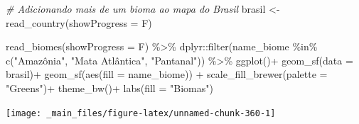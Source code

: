 \documentclass[
  brazilian,
]{book}
\newenvironment{Shaded}{\begin{snugshade}}{\end{snugshade}}
\newcommand{\AttributeTok}[1]{\textcolor[rgb]{0.77,0.63,0.00}{#1}}
\newcommand{\CommentTok}[1]{\textcolor[rgb]{0.56,0.35,0.01}{\textit{#1}}}
\newcommand{\FunctionTok}[1]{\textcolor[rgb]{0.00,0.00,0.00}{#1}}
\newcommand{\NormalTok}[1]{#1}
\newcommand{\OtherTok}[1]{\textcolor[rgb]{0.56,0.35,0.01}{#1}}
\newcommand{\SpecialCharTok}[1]{\textcolor[rgb]{0.00,0.00,0.00}{#1}}
\newcommand{\StringTok}[1]{\textcolor[rgb]{0.31,0.60,0.02}{#1}}
\begin{document}
\begin{Shaded}
\begin{Highlighting}[]
\CommentTok{\# Adicionando mais de um bioma ao mapa do Brasil}
\NormalTok{brasil }\OtherTok{\textless{}{-}} \FunctionTok{read\_country}\NormalTok{(}\AttributeTok{showProgress =}\NormalTok{ F)}

\FunctionTok{read\_biomes}\NormalTok{(}\AttributeTok{showProgress =}\NormalTok{ F) }\SpecialCharTok{\%\textgreater{}\%} 
\NormalTok{  dplyr}\SpecialCharTok{::}\FunctionTok{filter}\NormalTok{(name\_biome }\SpecialCharTok{\%in\%} \FunctionTok{c}\NormalTok{(}\StringTok{"Amazônia"}\NormalTok{, }\StringTok{"Mata Atlântica"}\NormalTok{, }\StringTok{"Pantanal"}\NormalTok{)) }\SpecialCharTok{\%\textgreater{}\%}
  \FunctionTok{ggplot}\NormalTok{()}\SpecialCharTok{+}
  \FunctionTok{geom\_sf}\NormalTok{(}\AttributeTok{data =}\NormalTok{ brasil)}\SpecialCharTok{+}
  \FunctionTok{geom\_sf}\NormalTok{(}\FunctionTok{aes}\NormalTok{(}\AttributeTok{fill =}\NormalTok{ name\_biome)) }\SpecialCharTok{+}
  \FunctionTok{scale\_fill\_brewer}\NormalTok{(}\AttributeTok{palette =} \StringTok{"Greens"}\NormalTok{)}\SpecialCharTok{+}
  \FunctionTok{theme\_bw}\NormalTok{()}\SpecialCharTok{+}
  \FunctionTok{labs}\NormalTok{(}\AttributeTok{fill =} \StringTok{"Biomas"}\NormalTok{)}
\end{Highlighting}
\end{Shaded}

\begin{center}\texttt{[image: \_main\_files/figure-latex/unnamed-chunk-360-1]} \end{center}
\end{document}
